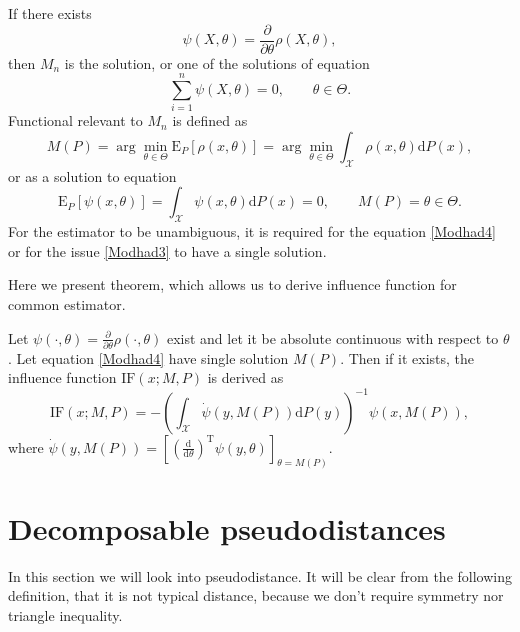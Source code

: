 If there exists
\begin{equation}
	\psi(X,\theta) = \frac{\partial}{\partial \theta} \rho(X,\theta), 
\end{equation}
then $M_n$ is the solution, or one of the solutions of equation 
\begin{equation}
	\sum_{i=1}^n \psi(X,\theta) = 0, \qquad \theta \in \Theta.
	\label{Modhad2}
\end{equation}
Functional relevant to $M_n$ is defined as 
\begin{equation}
	M(P) = \arg \min_{\theta \in \Theta} \mathrm{E}_{P}\left[ \rho(x,\theta) \right] = \arg \min_{\theta \in \Theta} \int_\mathcal{X} \rho(x,\theta) \mathrm{d}P(x),
	\label{Modhad3}
\end{equation}
or as a solution to equation 
\begin{equation}
\mathrm{E}_{P}\left[ \psi(x,\theta) \right] =  \int_\mathcal{X} \psi(x,\theta) \mathrm{d}P(x) = 0, \qquad M(P) = \theta \in \Theta.
\label{Modhad4}
\end{equation}
For the estimator to be unambiguous, it is required for the equation \ref{Modhad4} or for the issue  \ref{Modhad3} to have a single solution.

Here we present theorem, which allows us to derive influence function for common \ren estimator.
\begin{theorem} 
Let $\psi(\cdot,\theta) =  \frac{\partial}{\partial \theta} \rho(\cdot,\theta)$ exist and let it be absolute continuous with respect to $\theta$. Let equation \eqref{Modhad4} have single solution $M(P)$. Then if it exists, the influence function $\mathrm{IF}(x;M,P)$ is derived as
\begin{equation}
 \text{IF}(x;M,P) = -\left(\int_{\mathcal{X}} \dot{\psi} (y,M(P)) \mathrm{d}P(y)\right)^{-1} \psi(x,M(P)),
\end{equation}
where $\dot{\psi} (y,M(P)) = \left[\left(\frac{\mathrm{d}}{\mathrm{d}\theta}\right)^\mathrm{T}\psi(y,\theta)\right]_{\theta = M(P)}$.
\label{influencni veta}
\end{theorem}

\section{Decomposable pseudodistances}

In this section we will look into \ren pseudodistance. It will be clear from the following definition, that it is not typical distance, because we don't require symmetry nor triangle inequality. 


